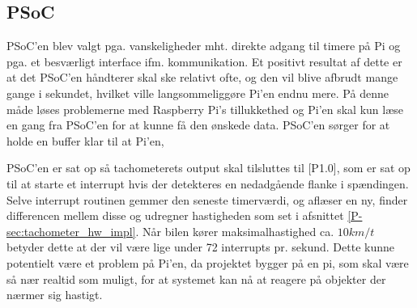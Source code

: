 \subsection{PSoC} \label{sec:swd_psoc_board}

PSoC'en blev valgt pga. vanskeligheder mht. direkte adgang til timere på Pi og pga. et besværligt interface ifm. \IIC kommunikation. Et positivt resultat af dette er at det PSoC'en håndterer skal ske relativt ofte, og den vil blive afbrudt mange gange i sekundet, hvilket ville langsommeliggøre Pi'en endnu mere. På denne måde løses problemerne med Raspberry Pi's tillukkethed og Pi'en skal kun læse en gang fra PSoC'en for at kunne få den ønskede data. PSoC'en sørger for at holde en buffer klar til at Pi'en,  


PSoC'en er sat op så tachometerets output skal tilsluttes til [P1.0], som er sat op til at starte et interrupt hvis der detekteres en nedadgående flanke i spændingen. Selve interrupt routinen gemmer den seneste timerværdi, og aflæser en ny, finder differencen mellem disse og udregner hastigheden som set i afsnittet \ref{P-sec:tachometer_hw_impl}. Når bilen kører maksimalhastighed ca. $10km/t$ betyder dette at der vil være lige under 72 interrupts pr. sekund. Dette kunne potentielt være et problem på Pi'en, da projektet bygger på en pi, som skal være så nær realtid som muligt, for at systemet kan nå at reagere på objekter der nærmer sig hastigt.